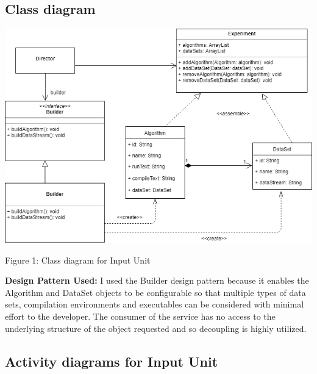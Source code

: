 \subsection{Class diagram}
	\includegraphics[width=\textwidth]{input_unit/images/input_unit_class_diagram.png}
	\begin{center}
	    \small{Figure 1: Class diagram for Input Unit}
    \end{center}
 \begin{flushleft}
\par\textbf{Design Pattern Used: }
	I used the Builder design pattern because it enables the Algorithm and DataSet objects to be configurable so that multiple types of data sets, compilation environments and executables can be considered with minimal effort to the developer. The consumer of the service has no access to the underlying structure of the object requested and so decoupling is highly utilized.
    \end{flushleft}
	
\subsection{Activity diagrams for Input Unit}
